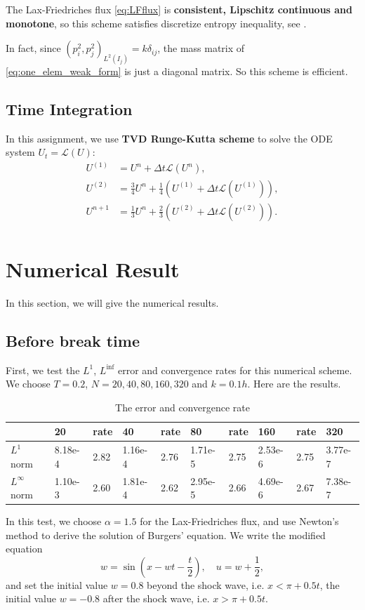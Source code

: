 \documentclass[a4paper]{article}
\begin{document}
The Lax-Friedriches flux \eqref{eq:LFflux} is \textbf{consistent, Lipschitz 
continuous and monotone}, so this scheme satisfies discretize entropy inequality, 
see \cite{2}.

In fact, since $(p_{i}^{2},p_{j}^{2})_{L^{2}(I_j)}=k\delta_{ij}$, the mass matrix of 
\eqref{eq:one_elem_weak_form} is just a diagonal matrix. 
So this scheme is efficient.
\subsection{Time Integration}
In this assignment, we use \textbf{TVD Runge-Kutta scheme} to solve 
the ODE system $U_{t}=\mathcal{L}(U)$:
\begin{equation}
    \label{eq:TVD-RK}
    \begin{aligned}
    U^{(1)}&=U^{n}+\Delta t\mathcal{L}(U^{n}),\\
    U^{(2)}&=\frac{3}{4}U^{n}+\frac{1}{4}(U^{(1)}+\Delta t\mathcal{L}(U^{(1)})),\\
    U^{n+1}&=\frac{1}{3}U^{n}+\frac{2}{3}(U^{(2)}+\Delta t\mathcal{L}(U^{(2)})).\\
    \end{aligned}
\end{equation}
\section{Numerical Result}
In this section, we will give the numerical results.
\subsection{Before break time}
First, we test the $L^{1}$, $L^{\inf}$ error and convergence rates for this numerical scheme. 
We choose $T=0.2$, $N=20,40,80,160,320$ and $k=0.1h$. Here are the results.
\begin{table}[H]
    \begin{tabular}{llllllllll}
        \hline
                          & 20      & rate & 40      & rate & 80      & rate & 160     & rate & 320     \\ \hline
        $L^{1}$ norm      & 8.18e-4 & 2.82 & 1.16e-4 & 2.76 & 1.71e-5 & 2.75 & 2.53e-6 & 2.75 & 3.77e-7 \\
        $L^{\infty}$ norm & 1.10e-3 & 2.60 & 1.81e-4 & 2.62 & 2.95e-5 & 2.66 & 4.69e-6 & 2.67 & 7.38e-7 \\ \hline
    \end{tabular}   
    \caption{The error and convergence rate} 
\end{table} 
In this test, we choose $\alpha=1.5$ for the Lax-Friedriches flux, and use 
Newton's method to derive the solution of Burgers' equation. We write the 
modified equation 
\begin{displaymath}
    w=\sin(x-wt-\frac{t}{2}),\quad u=w+\frac{1}{2},
\end{displaymath}
and set the initial value $w=0.8$ beyond the shock wave, i.e. $x<\pi+0.5t$, the initial value 
$w=-0.8$ after the shock wave, i.e. $x>\pi+0.5t$.
\end{document}
